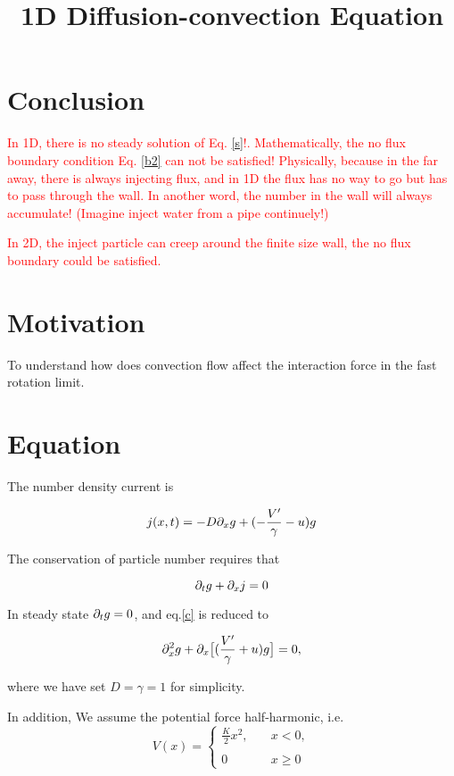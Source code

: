 \documentclass{../Templetes/1c}
\begin{document}
\title {1D Diffusion-convection Equation} 
\maketitle


\section{Conclusion}
\textcolor{red}{
In 1D, there is no steady solution of Eq. \eqref{s}!. Mathematically, 
the no flux boundary condition Eq. \eqref{b2} can not be satisfied!
Physically, because in the far away, there is always injecting flux, and in 1D the flux 
has no way to go but has to pass through the wall. In another word, the number in the wall will 
always accumulate! (Imagine inject water from a pipe continuely!)
}

\textcolor{red}{
In 2D, the inject particle can creep around the finite size wall, the no flux boundary could be satisfied. 
}



\section{Motivation}
To understand how does convection flow affect the interaction force in the fast rotation limit.



\section{Equation}
The number density current is 

\begin{equation}
j(x,t)=-D\partial_x g+(-\frac{V'}{\gamma}-u)g
\end{equation}

The conservation of particle number requires that

\begin{equation} \label{c}
\partial_t g+ \partial_x j=0
\end{equation}

In steady state $\partial_tg=0$, and eq.\eqref{c} is reduced to

\begin{equation} \label{s}
\partial_x^2 g+\partial_x\big[(\frac{V'}{\gamma}+u)g\big]=0,
\end{equation}  

where we have set $D=\gamma=1$ for simplicity. 

In addition, We assume the potential force half-harmonic, i.e. 
\begin{equation}
    V(x)=
   \begin{cases}
    \frac{K}{2}x^2, &\quad x<0, \\
    & \\
    0 & \quad x\geq 0 
   \end{cases}
  \end{equation}
\end{document}
